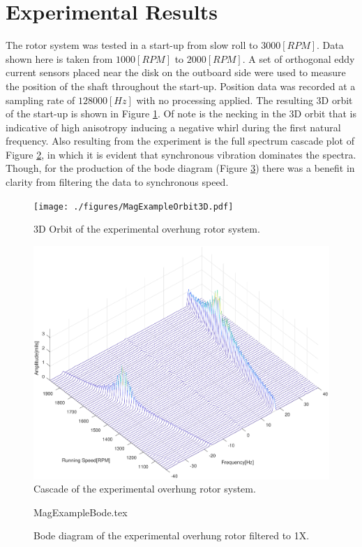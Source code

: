 \section{Experimental Results}
The rotor system was tested in a start-up from slow roll to $ 3000[RPM] $. Data shown here is taken from $ 1000[RPM] $ to $ 2000[RPM] $. A set of orthogonal eddy current sensors placed near the disk on the outboard side were used to measure the position of the shaft throughout the start-up. Position data was recorded at a sampling rate of $ 128000[Hz] $ with no processing applied. The resulting 3D orbit of the start-up is shown in Figure \ref{fig:MagExampleOrbit3D}. Of note is the necking in the 3D orbit that is indicative of high anisotropy inducing a negative whirl during the first natural frequency. Also resulting from the experiment is the full spectrum cascade plot of Figure \ref{fig:MagExampleCascade}, in which it is evident that synchronous vibration dominates the spectra. Though, for the production of the bode diagram (Figure \ref{fig:MagExampleBode}) there was a benefit in clarity from filtering the data to synchronous speed.
\begin{figure}
	\centering
	\texttt{[image: ./figures/MagExampleOrbit3D.pdf]}
	\caption{3D Orbit of the experimental overhung rotor system.}
	\label{fig:MagExampleOrbit3D}
\end{figure}
\begin{figure}
	\centering
	\includegraphics[width=.5\linewidth]{./figures/MagExampleCascade.pdf}
	\caption{Cascade of the experimental overhung rotor system.}
	\label{fig:MagExampleCascade}
\end{figure}
\begin{figure}[!htb]
	\def\width{.7\linewidth}
	\def\height{.4\linewidth}
	\def\sep{3em}
	\centering
	{MagExampleBode.tex}
	\caption{Bode diagram of the experimental overhung rotor filtered to 1X.}
	\label{fig:MagExampleBode}
\end{figure}
